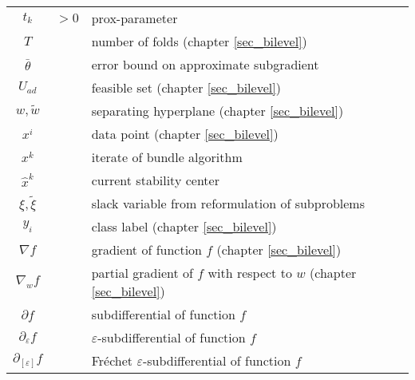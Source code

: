 \begin{longtable}{c@{}c@{} l@{}}
	\(t_k\) &\(>0\)& prox-parameter \\
	\(T\) && number of folds (chapter \ref{sec_bilevel}) \\
	\(\bar{\theta}\) && error bound on approximate subgradient \\
	\(U_{ad}\) && feasible set (chapter \ref{sec_bilevel}) \\
	\(w, \tilde{w}\) && separating hyperplane (chapter \ref{sec_bilevel}) \\
	\(x^i\) && data point (chapter \ref{sec_bilevel}) \\ 
	\(x^k\) && iterate of bundle algorithm \\
	\(\hat{x}^k\) && current stability center \\
	\(\xi,\tilde{\xi}\) && slack variable from reformulation of subproblems \\
	\(y_i\) && class label (chapter \ref{sec_bilevel}) \\
	\(\nabla f\) && gradient of function \(f\) (chapter \ref{sec_bilevel})\\
	\(\nabla_{w}f\) && partial gradient of \(f\) with respect to \(w\) (chapter \ref{sec_bilevel}) \\
	\(\partial f\) && subdifferential of function \(f\) \\
	\(\partial_{\varepsilon}f\) && \(\varepsilon\)-subdifferential of function \(f\) \\
	\(\partial_{[\varepsilon]}f\) && Fr{\'e}chet \(\varepsilon\)-subdifferential of function \(f\)\\
\end{longtable}
